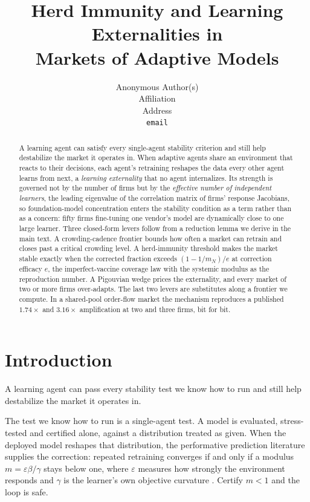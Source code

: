 \documentclass{article}
\title{Herd Immunity and Learning Externalities in\\ Markets of Adaptive Models}
\author{%
  Anonymous Author(s) \\
  Affiliation \\
  Address \\
  \texttt{email} \\
}
\theoremstyle{plain}
\theoremstyle{definition}
\newcommand{\mN}{m_N}
\begin{document}
\maketitle

\begin{abstract}
A learning agent can satisfy every single-agent stability criterion and still help destabilize the market it operates in. When adaptive agents share an environment that reacts to their decisions, each agent's retraining reshapes the data every other agent learns from next, a \emph{learning externality} that no agent internalizes. Its strength is governed not by the number of firms but by the \emph{effective number of independent learners}, the leading eigenvalue of the correlation matrix of firms' response Jacobians, so foundation-model concentration enters the stability condition as a term rather than as a concern: fifty firms fine-tuning one vendor's model are dynamically close to one large learner. Three closed-form levers follow from a reduction lemma we derive in the main text. A crowding-cadence frontier bounds how often a market can retrain and closes past a critical crowding level. A herd-immunity threshold makes the market stable exactly when the corrected fraction exceeds $(1-1/\mN)/e$ at correction efficacy $e$, the imperfect-vaccine coverage law with the systemic modulus as the reproduction number. A Pigouvian wedge prices the externality, and every market of two or more firms over-adapts. The last two levers are substitutes along a frontier we compute. In a shared-pool order-flow market the mechanism reproduces a published $1.74\times$ and $3.16\times$ amplification at two and three firms, bit for bit.
\end{abstract}

\section{Introduction}

A learning agent can pass every stability test we know how to run and still help destabilize the market it operates in.

The test we know how to run is a single-agent test. A model is evaluated, stress-tested and certified alone, against a distribution treated as given. When the deployed model reshapes that distribution, the performative prediction literature supplies the correction: repeated retraining converges if and only if a modulus $m = \varepsilon\beta/\gamma$ stays below one, where $\varepsilon$ measures how strongly the environment responds and $\gamma$ is the learner's own objective curvature \citep{perdomo2020}. Certify $m<1$ and the loop is safe.
\end{document}
